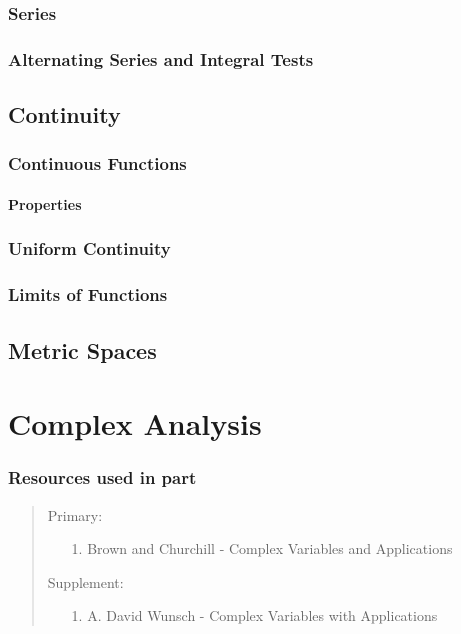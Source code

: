 \documentclass[12pt, english]{book}
\newenvironment{partintro}
{\vspace*{\fill}
	\section*{\centering Resources used in part \thepart}
	\begin{quotation}}
	{\end{quotation}\vspace*{\fill}\newpage}
\begin{document}
	\section{Series} \label{Series Section - Real Analysis}
	
	\section{Alternating Series and Integral Tests} \label{Alternating Series and Integral Tests Section - Real Analysis}
	
	\chapter{Continuity} \label{Continuity Chapter - Real Analysis}
	
	\section{Continuous Functions} \label{Continuous Functions Section - Real Analysis}
	
	\subsection{Properties} \label{Properties of Continuous Functions Subsection - Real Analysis}
	
	\section{Uniform Continuity} \label{Uniform Continuity Section - Real Analysis}
	
	\section{Limits of Functions} \label{Limits of Functions Section - Real Analysis}

	\chapter{Metric Spaces}	
	
	\part{Complex Analysis} \label{Complex Analysis Part}
	\begin{partintro}
	\noindent Primary:
		\begin{itemize}
			\item[1.] Brown and Churchill - Complex Variables and Applications \cite{Brown.J;Churchill.R-Complex-Variables-2014}
		\end{itemize}
		Supplement: 
		\begin{itemize}
			\item[1.] A. David Wunsch - Complex Variables with Applications \cite{Wunsh.A-Complex-Variables-2005}
		\end{itemize}
	\end{partintro}
	
\end{document}
